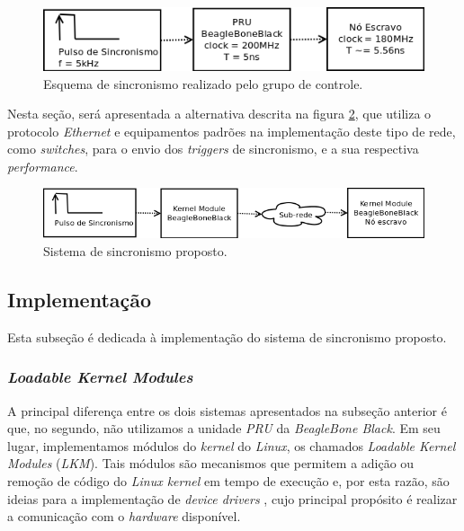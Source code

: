 \begin{figure}[h]

\centering
\includegraphics[scale=0.65]{image/pru_bbb_sincronismo}
\caption {Esquema de sincronismo realizado pelo grupo de controle.}
\label{fig:pru_sincronismo}
\end{figure}

\vspace{12pt}

Nesta seção, será apresentada a alternativa descrita na figura
\ref{fig:pru_sincronismo_ethernet}, que utiliza o protocolo \textit{Ethernet} e
equipamentos padrões na implementação deste tipo de rede, como
\textit{switches}, para o envio dos \textit{triggers} de sincronismo, e a sua
respectiva \textit{performance}.

\begin{figure}[h]

\centering
\includegraphics[scale=0.65]{image/pru_bbb_sincronismo_ethernet}
\caption {Sistema de sincronismo proposto.}
\label{fig:pru_sincronismo_ethernet}
\end{figure}

\subsection {Implementação}

Esta subseção é dedicada à implementação do sistema de sincronismo proposto.

\subsubsection{\textit{Loadable Kernel Modules}}

A principal diferença entre os dois sistemas apresentados na subseção anterior é
que, no segundo, não utilizamos a unidade \textit{PRU} da \textit{BeagleBone
Black}. Em seu lugar, implementamos módulos do \textit{kernel} do
\textit{Linux}, os chamados \textit{Loadable Kernel Modules} (\textit{LKM}).
Tais módulos são mecanismos que permitem a adição ou remoção de código do \textit{Linux kernel}
em tempo de execução e, por esta razão, são ideias para a implementação de
\textit{device drivers} \cite{derek}, cujo principal propósito é realizar a
comunicação com o \textit{hardware} disponível.  

